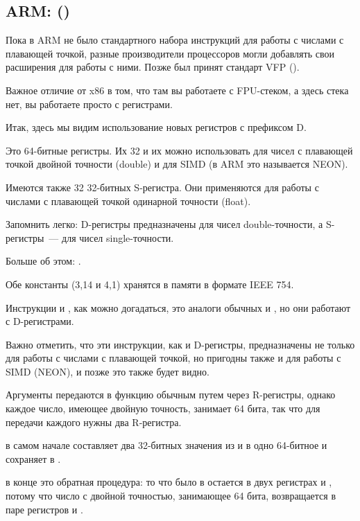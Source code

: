 \subsection{ARM: \OptimizingXcodeIV (\ARMMode)}

Пока в ARM не было стандартного набора инструкций для работы с числами с плавающей точкой, разные производители процессоров
могли добавлять свои расширения для работы с ними.
Позже был принят стандарт VFP ().

Важное отличие от x86 в том, что там вы работаете с FPU-стеком, а здесь стека нет, вы работаете просто с регистрами.



Итак, здесь мы видим использование новых регистров с префиксом D.

Это 64-битные регистры. Их 32 и их можно
использовать для чисел с плавающей точкой двойной точности (double) и для 
SIMD (в ARM это называется NEON).

Имеются также 32 32-битных S-регистра. Они применяются для работы с числами 
с плавающей точкой одинарной точности (float).

Запомнить легко: D-регистры предназначены для чисел double-точности, 
а S-регистры~--- для чисел single-точности.

Больше об этом: .

Обе константы (3,14 и 4,1) хранятся в памяти в формате IEEE 754.

Инструкции  и , как можно догадаться, это аналоги обычных  и \MOV, но они работают с D-регистрами.

Важно отметить, что эти инструкции, как и D-регистры, предназначены не только для работы 
с числами с плавающей точкой, но пригодны также и для работы с SIMD (NEON), и позже это также будет видно.

Аргументы передаются в функцию обычным путем через R-регистры, однако 
каждое число, имеющее двойную точность, занимает 64 бита, так что для передачи каждого нужны два R-регистра.

 в самом начале составляет два 32-битных значения из  и  в одно 64-битное и сохраняет в .

 в конце это обратная процедура: то что было в  
остается в двух регистрах  и , потому что число с двойной точностью, 
занимающее 64 бита, возвращается в паре регистров  и .

